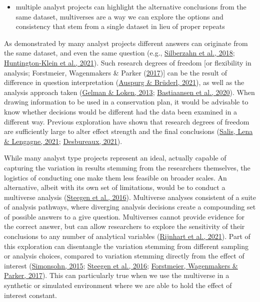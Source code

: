 \documentclass[10pt,a4paper]{article}
\providecommand{\tightlist}{%
  \setlength{\itemsep}{0pt}\setlength{\parskip}{0pt}}
\begin{document}
\begin{itemize}
\tightlist
\item
  multiple analyst projects can highlight the alternative conclusions from the same dataset, multiverses are a way we can explore the options and consistency that stem from a single dataset in lieu of proper repeats
\end{itemize}

As demonstrated by many analyst projects different answers can originate from the same dataset, and even the same question (e.g., \protect\hyperlink{ref-silberzahn_many_2018}{Silberzahn et al., 2018}; \protect\hyperlink{ref-huntingtonklein_influence_2021}{Huntington‐Klein et al., 2021}).
Such research degrees of freedom {[}or flexibility in analysis; Forstmeier, Wagenmakers \& Parker (\protect\hyperlink{ref-forstmeier_detecting_2017}{2017}){]} can be the result of difference in question interpretation (\protect\hyperlink{ref-auspurg_has_2021}{Auspurg \& Brüderl, 2021}), as well as the analysis approach taken (\protect\hyperlink{ref-gelman_garden_2013}{Gelman \& Loken, 2013}; \protect\hyperlink{ref-bastiaansen_time_2020}{Bastiaansen et al., 2020}).
When drawing information to be used in a conservation plan, it would be advisable to know whether decisions would be different had the data been examined in a different way.
Previous exploration have shown that research degrees of freedom are sufficiently large to alter effect strength and the final conclusions (\protect\hyperlink{ref-salis_how_2021}{Salis, Lena \& Lengagne, 2021}; \protect\hyperlink{ref-desbureaux_subjective_2021}{Desbureaux, 2021}).

While many analyst type projects represent an ideal, actually capable of capturing the variation in results stemming from the researchers themselves, the logistics of conducting one make them less feasible on broader scales.
An alternative, albeit with its own set of limitations, would be to conduct a multiverse analysis (\protect\hyperlink{ref-steegen_increasing_2016}{Steegen et al., 2016}).
Multiverse analyses consistent of a suite of analysis pathways, where diverging analysis decisions create a compounding set of possible answers to a give question.
Multiverses cannot provide evidence for the correct answer, but can allow researchers to explore the sensitivity of their conclusions to any number of analytical variables (\protect\hyperlink{ref-rijnhart_assessing_2021}{Rijnhart et al., 2021}).
Part of this exploration can disentangle the variation stemming from different sampling or analysis choices, compared to variation stemming directly from the effect of interest (\protect\hyperlink{ref-simonsohn_small_2015}{Simonsohn, 2015}; \protect\hyperlink{ref-steegen_increasing_2016}{Steegen et al., 2016}; \protect\hyperlink{ref-forstmeier_detecting_2017}{Forstmeier, Wagenmakers \& Parker, 2017}).
This can particularly true when we use the multiverse in a synthetic or simulated environment where we are able to hold the effect of interest constant.
\end{document}
